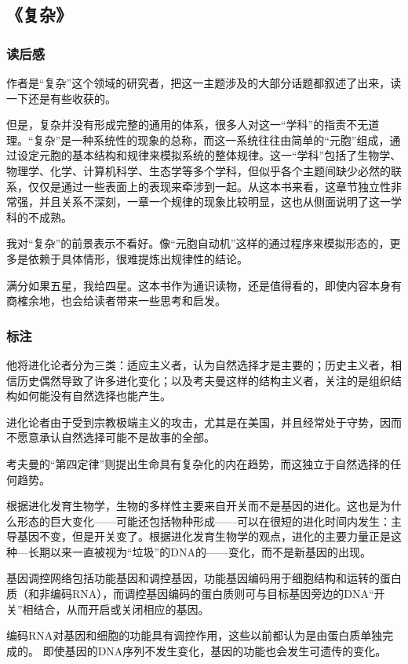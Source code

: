\subsection{《复杂》}
\subsubsection{读后感}
作者是“复杂”这个领域的研究者，把这一主题涉及的大部分话题都叙述了出来，读一下还是有些收获的。

但是，复杂并没有形成完整的通用的体系，很多人对这一“学科”的指责不无道理。“复杂”是一种系统性的现象的总称，而这一系统往往由简单的“元胞”组成，通过设定元胞的基本结构和规律来模拟系统的整体规律。这一“学科”包括了生物学、物理学、化学、计算机科学、生态学等多个学科，但似乎各个主题间缺少必然的联系，仅仅是通过一些表面上的表现来牵涉到一起。从这本书来看，这章节独立性非常强，并且关系不深刻，一章一个规律的现象比较明显，这也从侧面说明了这一学科的不成熟。

我对“复杂”的前景表示不看好。像“元胞自动机”这样的通过程序来模拟形态的，更多是依赖于具体情形，很难提炼出规律性的结论。

满分如果五星，我给四星。这本书作为通识读物，还是值得看的，即使内容本身有商榷余地，也会给读者带来一些思考和启发。

\subsubsection{标注}
他将进化论者分为三类：适应主义者，认为自然选择才是主要的；历史主义者，相信历史偶然导致了许多进化变化；以及考夫曼这样的结构主义者，关注的是组织结构如何能没有自然选择也能产生。

进化论者由于受到宗教极端主义的攻击，尤其是在美国，并且经常处于守势，因而不愿意承认自然选择可能不是故事的全部。

考夫曼的“第四定律”则提出生命具有复杂化的内在趋势，而这独立于自然选择的任何趋势。

根据进化发育生物学，生物的多样性主要来自开关而不是基因的进化。这也是为什么形态的巨大变化——可能还包括物种形成——可以在很短的进化时间内发生：主导基因不变，但是开关变了。根据进化发育生物学的观点，进化的主要力量正是这种—长期以来一直被视为“垃圾”的DNA的——变化，而不是新基因的出现。

基因调控网络包括功能基因和调控基因，功能基因编码用于细胞结构和运转的蛋白质（和非编码RNA），而调控基因编码的蛋白质则可与目标基因旁边的DNA“开关”相结合，从而开启或关闭相应的基因。

编码RNA对基因和细胞的功能具有调控作用，这些以前都认为是由蛋白质单独完成的。
即使基因的DNA序列不发生变化，基因的功能也会发生可遗传的变化。

